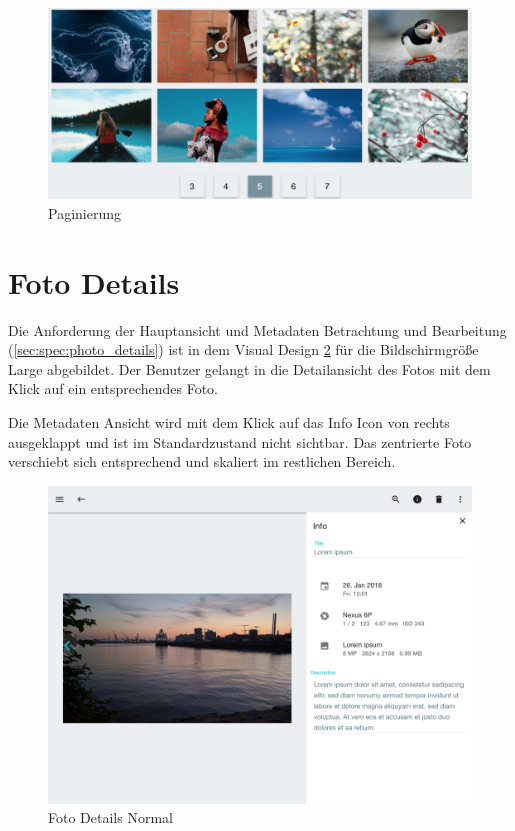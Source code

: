 \begin{figure}[htp]     %
\centering
\includegraphics[width=1.0\textwidth]{images/pagination}
\caption{Paginierung}\label{fig:pagination}
\end{figure}

\section{Foto Details}
Die Anforderung der Hauptansicht und Metadaten Betrachtung und Bearbeitung (\ref{sec:spec:photo_details}) ist in dem Visual Design \ref{fig:form_normal} für die Bildschirmgröße Large abgebildet. Der Benutzer gelangt in die Detailansicht des Fotos mit dem Klick auf ein entsprechendes Foto.

Die Metadaten Ansicht wird mit dem Klick auf das Info Icon von rechts ausgeklappt und ist im Standardzustand nicht sichtbar. Das zentrierte Foto verschiebt sich entsprechend und skaliert im restlichen Bereich.

\begin{figure}[htp]     %
\centering
\includegraphics[width=1.0\textwidth]{images/form_normal}
\caption{Foto Details Normal}\label{fig:form_normal}
\end{figure}

